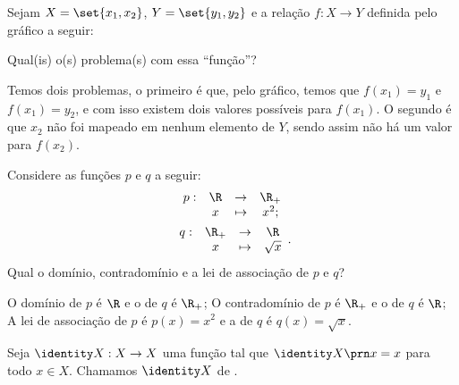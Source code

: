 \begin{example}
Sejam $X = \set{x_1, x_2}$, $Y = \set{y_1, y_2}$ e a relação $f : X \to Y$ definida pelo gráfico a seguir:
\begin{center}
\end{center}
Qual(is) o(s) problema(s) com essa ``função''?
\end{example}
\begin{solution}
Temos dois problemas, o primeiro é que, pelo gráfico, temos que $f(x_1) = y_1$ e $f(x_1) = y_2$, e com isso existem dois valores possíveis para $f(x_1)$. O segundo é que $x_2$ não foi mapeado em nenhum elemento de $Y$, sendo assim não há um valor para $f(x_2)$.
\end{solution}


\begin{example}
\label{example:func-sq-sqrt}
Considere as funções $p$ e $q$ a seguir:
%
\begin{gather*}
\begin{array}{cccc}
p : & \R & \to     & \R_+ \\
     &  x & \mapsto & x^2;
\end{array}\\
\begin{array}{cccc}
q : & \R_+ & \to     & \R \\
     &  x & \mapsto & \sqrt x
\end{array}.
\end{gather*}
%
Qual o domínio, contradomínio e a lei de associação de $p$ e $q$?
\end{example}

\begin{solution}
O domínio de $p$ é $\R$ e o de $q$ é $\R_+$; 
O contradomínio de $p$ é $\R_+$ e o de $q$ é $\R$; 
A lei de associação de $p$ é $p(x)=x^2$ e a de $q$ é $q(x)=\sqrt x$.
\end{solution}

\begin{definition}
\label{def:funcao-identidade-conjunto}
Seja $\identity X : X \to X $ uma função tal que $\identity X \prn x = x$ para todo $x \in X$. Chamamos $\identity X$ de .
\end{definition}